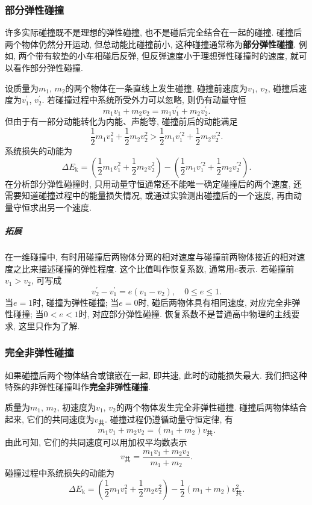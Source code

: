 \documentclass[11pt,a4paper]{ctexbook}
\begin{document}
\subsubsection{部分弹性碰撞}

许多实际碰撞既不是理想的弹性碰撞, 也不是碰后完全结合在一起的碰撞. 碰撞后两个物体仍然分开运动,
但总动能比碰撞前小, 这种碰撞通常称为\textbf{部分弹性碰撞}. 例如, 两个带有软垫的小车相碰后反弹,
但反弹速度小于理想弹性碰撞时的速度, 就可以看作部分弹性碰撞.

设质量为$m_1$, $m_2$的两个物体在一条直线上发生碰撞, 碰撞前速度为$v_1$, $v_2$,
碰撞后速度为$v_1^{\prime}$, $v_2^{\prime}$. 若碰撞过程中系统所受外力可以忽略, 则仍有动量守恒
$$m_1v_1+m_2v_2=m_1v_1^{\prime}+m_2v_2^{\prime}.$$
但由于有一部分动能转化为内能、声能等, 碰撞前后的动能满足
$$\frac12m_1v_1^2+\frac12m_2v_2^2>\frac12m_1v_1^{\prime 2}+\frac12m_2v_2^{\prime 2}.$$
系统损失的动能为
$$\Delta E_\mathrm{k}=\left(\frac12m_1v_1^2+\frac12m_2v_2^2\right)-\left(\frac12m_1v_1^{\prime 2}+\frac12m_2v_2^{\prime 2}\right).$$
在分析部分弹性碰撞时, 只用动量守恒通常还不能唯一确定碰撞后的两个速度, 还需要知道碰撞过程中的能量损失情况,
或通过实验测出碰撞后的一个速度, 再由动量守恒求出另一个速度.

\subparagraph{拓展} 在一维碰撞中, 有时用碰撞后两物体分离的相对速度与碰撞前两物体接近的相对速度之比来描述碰撞的弹性程度. 这个比值叫作恢复系数, 通常用$e$表示. 若碰撞前$v_1>v_2$, 可写成
$$v_2^{\prime}-v_1^{\prime}=e(v_1-v_2),\quad 0\leq e\leq 1.$$
当$e=1$时, 碰撞为弹性碰撞; 当$e=0$时, 碰后两物体具有相同速度, 对应完全非弹性碰撞; 当$0<e<1$时, 对应部分弹性碰撞. 恢复系数不是普通高中物理的主线要求, 这里只作为了解.

\subsubsection{完全非弹性碰撞}

如果碰撞后两个物体结合或镶嵌在一起, 即共速, 此时的动能损失最大.
我们把这种特殊的非弹性碰撞叫作\textbf{完全非弹性碰撞}.

质量为$m_1$, $m_2$, 初速度为$v_1$, $v_2$的两个物体发生完全非弹性碰撞.
碰撞后两物体结合起来, 它们的共同速度为$v_\text{共}$.
碰撞过程仍遵循动量守恒定律, 有
$$m_1v_1 + m_2v_2 = (m_1+m_2)v_\text{共}.$$
由此可知, 它们的共同速度可以用加权平均数表示
\begin{equation}
    v_\text{共} = \frac{m_1v_1 + m_2v_2}{m_1+m_2}.
\end{equation}
碰撞过程中系统损失的动能为
$$\Delta E_\mathrm{k} = \left(\frac12 m_1 v_1^2 + \frac12 m_2 v_2^2\right)-\frac12(m_1+m_2)v_\text{共}^2.$$
\end{document}
